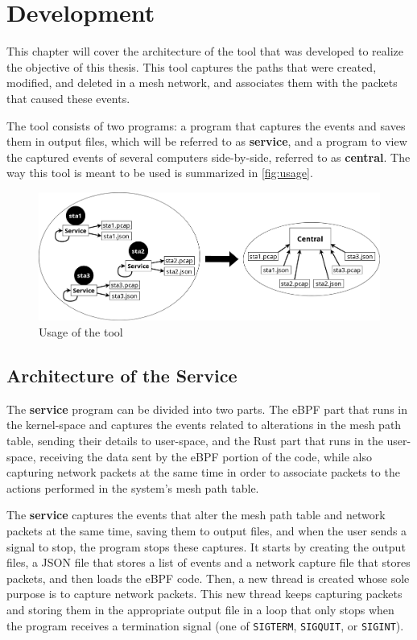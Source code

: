 \chapter{Development}\label{chap:devel}

This chapter will cover the architecture of the tool that was developed to
realize the objective of this thesis. This tool captures the paths that were
created, modified, and deleted in a mesh network, and associates them with the
packets that caused these events.

The tool consists of two programs: a program that captures the events and saves
them in output files, which will be referred to as \textbf{service}, and a
program to view the captured events of several computers side-by-side, referred
to as \textbf{central}. The way this tool is meant to be used is summarized in
\autoref{fig:usage}.

\begin{figure}[htb]
   \centering
   \includegraphics[scale=.225]{usage}
   \caption{Usage of the tool}\label{fig:usage}
\end{figure}


\section{Architecture of the Service}\label{sect:archser}

The \textbf{service} program can be divided into two parts. The eBPF part that
runs in the kernel-space and captures the events related to alterations in the
mesh path table, sending their details to user-space, and the Rust part that
runs in the user-space, receiving the data sent by the eBPF portion of the code,
while also capturing network packets at the same time in order to associate
packets to the actions performed in the system's mesh path table.

The \textbf{service} captures the events that alter the mesh path table and
network packets at the same time, saving them to output files, and when the user
sends a signal to stop, the program stops these captures. It starts by creating
the output files, a JSON file that stores a list of events and a network capture
file that stores packets, and then loads the eBPF code. Then, a new thread is
created whose sole purpose is to capture network packets. This new thread keeps
capturing packets and storing them in the appropriate output file in a loop that
only stops when the program receives a termination signal (one of
\texttt{SIGTERM}, \texttt{SIGQUIT}, or \texttt{SIGINT}).

